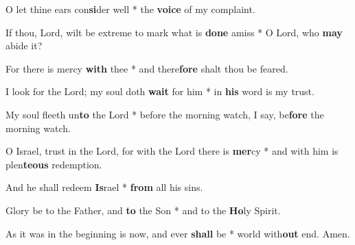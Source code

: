 \begin{multicols}{2}
	O let thine ears con\textbf{si}der well * the \textbf{voice} of my complaint.
	
	If thou, Lord, wilt be extreme to mark what is \textbf{done} amiss * O Lord, who \textbf{may} abide it?
	
	For there is mercy \textbf{with} thee * and there\textbf{fore} shalt thou be feared.
	
	I look for the Lord; my soul doth \textbf{wait} for him * in \textbf{his} word is my trust.
	
	My soul fleeth un\textbf{to} the Lord * before the morning watch, I say, be\textbf{fore} the morning watch.
	
	O Israel, trust in the Lord, for with the Lord there is \textbf{mer}cy * and with him is plen\textbf{teous} redemption.
	
	And he shall redeem \textbf{Is}rael * \textbf{from} all his sins.
	
	Glory be to the Father, and \textbf{to} the Son * and to the \textbf{Ho}ly Spirit.
	
	As it was in the beginning is now, and ever \textbf{shall} be * world with\textbf{out} end. Amen.
\end{multicols}